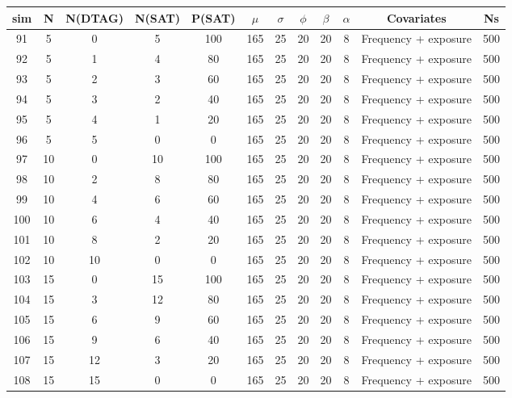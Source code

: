 \documentclass[
]{article}
\begin{document}
\begin{table}[H]
\centering
\begin{tabular}{cccccccccccc}
\toprule
\textbf{sim} & \textbf{N} & \textbf{N(DTAG)} & \textbf{N(SAT)} & \textbf{P(SAT)} & \textbf{$\mu$} & \textbf{$\sigma$} & \textbf{$\phi$} & \textbf{$\beta$} & \textbf{$\alpha$} & \textbf{Covariates} & \textbf{Ns}\\
\midrule
\rowcolor{gray!6}  91 & 5 & 0 & 5 & 100 & 165 & 25 & 20 & 20 & 8 & Frequency + exposure & 500\\
92 & 5 & 1 & 4 & 80 & 165 & 25 & 20 & 20 & 8 & Frequency + exposure & 500\\
\rowcolor{gray!6}  93 & 5 & 2 & 3 & 60 & 165 & 25 & 20 & 20 & 8 & Frequency + exposure & 500\\
94 & 5 & 3 & 2 & 40 & 165 & 25 & 20 & 20 & 8 & Frequency + exposure & 500\\
\rowcolor{gray!6}  95 & 5 & 4 & 1 & 20 & 165 & 25 & 20 & 20 & 8 & Frequency + exposure & 500\\
96 & 5 & 5 & 0 & 0 & 165 & 25 & 20 & 20 & 8 & Frequency + exposure & 500\\
\rowcolor{gray!6}  97 & 10 & 0 & 10 & 100 & 165 & 25 & 20 & 20 & 8 & Frequency + exposure & 500\\
98 & 10 & 2 & 8 & 80 & 165 & 25 & 20 & 20 & 8 & Frequency + exposure & 500\\
\rowcolor{gray!6}  99 & 10 & 4 & 6 & 60 & 165 & 25 & 20 & 20 & 8 & Frequency + exposure & 500\\
100 & 10 & 6 & 4 & 40 & 165 & 25 & 20 & 20 & 8 & Frequency + exposure & 500\\
\rowcolor{gray!6}  101 & 10 & 8 & 2 & 20 & 165 & 25 & 20 & 20 & 8 & Frequency + exposure & 500\\
102 & 10 & 10 & 0 & 0 & 165 & 25 & 20 & 20 & 8 & Frequency + exposure & 500\\
\rowcolor{gray!6}  103 & 15 & 0 & 15 & 100 & 165 & 25 & 20 & 20 & 8 & Frequency + exposure & 500\\
104 & 15 & 3 & 12 & 80 & 165 & 25 & 20 & 20 & 8 & Frequency + exposure & 500\\
\rowcolor{gray!6}  105 & 15 & 6 & 9 & 60 & 165 & 25 & 20 & 20 & 8 & Frequency + exposure & 500\\
106 & 15 & 9 & 6 & 40 & 165 & 25 & 20 & 20 & 8 & Frequency + exposure & 500\\
\rowcolor{gray!6}  107 & 15 & 12 & 3 & 20 & 165 & 25 & 20 & 20 & 8 & Frequency + exposure & 500\\
108 & 15 & 15 & 0 & 0 & 165 & 25 & 20 & 20 & 8 & Frequency + exposure & 500\\

\end{tabular}
\end{table}
\end{document}

